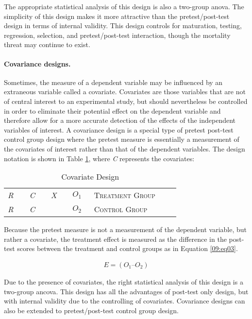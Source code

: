 The appropriate statistical analysis of this design is also a two-group \gls{anova}. The simplicity of this design makes it more attractive than the pretest/post-test design in terms of internal validity. This design controls for maturation, testing, regression, selection, and pretest/post-test interaction, though the mortality threat may continue to exist.

\paragraph{Covariance designs.} Sometimes, the measure of a dependent variable may be influenced by an extraneous variable called a \gls{covariate}. Covariates are those variables that are not of central interest to an experimental study, but should nevertheless be controlled in order to eliminate their potential effect on the dependent variable and therefore allow for a more accurate detection of the effects of the independent variables of interest. A covariance design is a special type of pretest post-test control group design where the pretest measure is essentially a measurement of the covariates of interest rather than that of the dependent variables. The design notation is shown in Table \ref{09:tab03}, where \textit{C} represents the covariates:

\begin{table}[H]
	\centering
	\begin{tabularx}{0.85\linewidth}{p{0.10\linewidth}p{0.10\linewidth}p{0.10\linewidth}p{0.10\linewidth}p{0.40\linewidth}}
		\toprule
		\textit{R} & \textit{C} & \textit{X} & $ O_1 $ & \textsc{Treatment Group} \\
		\textit{R} & \textit{C} &            & $ O_2 $ & \textsc{Control Group} \\
		\bottomrule
	\end{tabularx}
	\caption{Covariate Design}
	\label{09:tab03}
\end{table}

Because the pretest measure is not a measurement of the dependent variable, but rather a covariate, the treatment effect is measured as the difference in the post-test scores between the treatment and control groups as in Equation \ref{09:eq03}.

\begin{align}
	\label{09:eq03}
	E = (O_1 – O_2)
\end{align}

Due to the presence of covariates, the right statistical analysis of this design is a two-group \gls{ancova}. This design has all the advantages of post-test only design, but with internal validity due to the controlling of covariates. Covariance designs can also be extended to pretest/post-test control group design.

